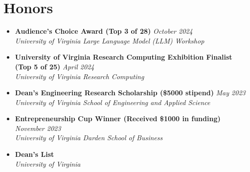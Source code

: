 \documentclass[letterpaper,11pt]{article}
\newcommand{\Date}[1]{\textit{\small #1}}
\newcommand{\heading}[4]{
  \textbf{#1} \hfill #2 \\
  \textit{\small#3} \hfill \Date{#4}
}
\begin{document}
\section{Honors}
\begin{itemize}[label={}, leftmargin=0pt]
  \item \heading{Audience's Choice Award \textnormal{(Top 3 of 28)}}{\Date{October 2024}}{University of Virginia Large Language Model (LLM) Workshop}{}
  \item \heading{University of Virginia Research Computing Exhibition Finalist \textnormal{(Top 5 of 25)}}{\Date{April 2024}}{University of Virginia Research Computing}{}
  \item \heading{Dean's Engineering Research Scholarship \textnormal{(\$5000 stipend)}}{\Date{May 2023}}{University of Virginia School of Engineering and Applied Science}{}
  \item \heading{Entrepreneurship Cup Winner \textnormal{(Received \$1000 in funding)}}{\Date{November 2023}}{University of Virginia Darden School of Business}{}
  \item \heading{Dean's List}{}{University of Virginia}{}
\end{itemize}
\end{document}

